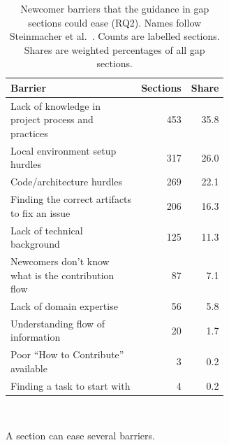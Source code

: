 \begin{table}[t]
\caption{Newcomer barriers that the guidance in gap sections could ease (RQ2). Names follow
Steinmacher et al.~\cite{steinmacher2015barriers}. Counts are labelled sections. Shares are
weighted percentages of all gap sections.}
\label{tab:rq2bar}
\small
\begin{tabular}{p{0.62\linewidth}rr}
\toprule
Barrier & Sections & Share \\
\midrule
Lack of knowledge in project process and practices & 453 & 35.8 \\
Local environment setup hurdles & 317 & 26.0 \\
Code/architecture hurdles & 269 & 22.1 \\
Finding the correct artifacts to fix an issue & 206 & 16.3 \\
Lack of technical background & 125 & 11.3 \\
Newcomers don't know what is the contribution flow & 87 & 7.1 \\
Lack of domain expertise & 56 & 5.8 \\
Understanding flow of information & 20 & 1.7 \\
Poor ``How to Contribute'' available & 3 & 0.2 \\
Finding a task to start with & 4 & 0.2 \\
\bottomrule
\end{tabular}
\\[2pt]
\parbox{\linewidth}{\footnotesize A section can ease several barriers.}
\end{table}
